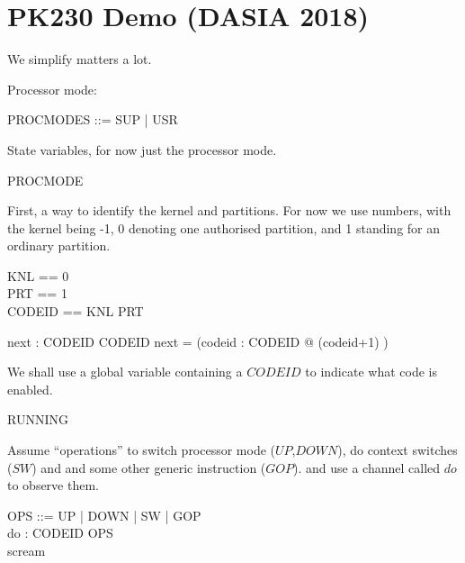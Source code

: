 \chapter{PK230 Demo (DASIA 2018)}

We simplify matters a lot.


Processor mode:
\begin{circus}
   PROCMODES ::= SUP | USR
\end{circus}

State variables, for now just the processor mode.
\begin{circus}
PROCMODE 
\end{circus}

First, a way to identify the kernel and partitions.
For now we use numbers, with the kernel being -1,
0 denoting one authorised partition,
and 1 standing for an ordinary partition.
\begin{circus}
   KNL    == 0
\\ PRT    == 1
\\ CODEID == KNL \upto PRT
\end{circus}

\begin{axdef}
 next : CODEID \fun CODEID
\where
 next = (\lambda codeid : CODEID @ (codeid+1) )
\end{axdef}

We shall use a global variable containing a $CODEID$ to indicate
what code is enabled.
\begin{circus}
RUNNING 
\end{circus}

Assume ``operations'' to switch processor mode ($UP$,$DOWN$),
do context switches ($SW$)
and and some other generic instruction ($GOP$).
and use a channel called $do$ to observe them.
\begin{circus}
   OPS ::= UP | DOWN | SW | GOP
\\ \circchannel do : CODEID \cross OPS
\\ \circchannel scream
\end{circus}



